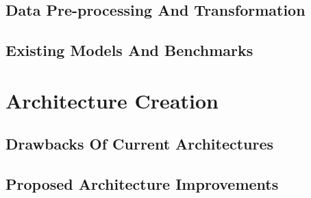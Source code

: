 \documentclass[12pt]{report}
\begin{document}
        \section{Data Pre-processing And Transformation}\label{c32}
        \section{Existing Models And Benchmarks}\label{c33}
    \chapter{\centering Architecture Creation}\label{c4}
        \section{Drawbacks Of Current Architectures}\label{c41}
        \section{Proposed Architecture Improvements}\label{c42}
\end{document}
